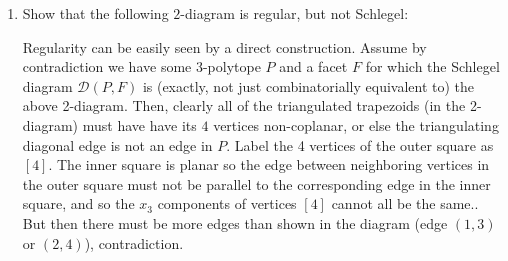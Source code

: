 \documentclass{article}
\begin{document}
\begin{enumerate}
(This subdivision is known as the \emph{Delaunay triangulation} of the point set $V$. It is of great importance for many aspects of computational geometry; see for example Edelsbrunner [190].)

\begin{proof}
    For $\bi{v} \in V$ write $\bi{v}' = \begin{pmatrix}
        \bi{v} \\ ||\bi{v}||^2
    \end{pmatrix}\in \mathbb{R}^{d+1}$. 

\end{proof}


\item Show that the following $2$-diagram is regular, but not Schlegel:

\begin{figure}[h]
    \centering
{}
\end{figure}

\begin{solution}
    Regularity can be easily seen by a direct construction. Assume by contradiction we have some 3-polytope $P$ and a facet $F$ for which the Schlegel diagram $\mathcal{D}(P, F)$ is (exactly, not just combinatorially equivalent to) the above 2-diagram. Then, clearly all of the triangulated trapezoids (in the 2-diagram) must have have its $4$ vertices non-coplanar, or else the triangulating diagonal edge is not an edge in $P$. Label the 4 vertices of the outer square as $[4]$. The inner square is planar so the edge between neighboring vertices in the outer square must not be parallel to the corresponding edge in the inner square, and so the $x_3$ components of vertices $[4]$ cannot all be the same.. But then there must be more edges than shown in the diagram (edge $(1,3)$ or $(2,4)$), contradiction.


\end{solution}
\end{enumerate}
\end{document}
